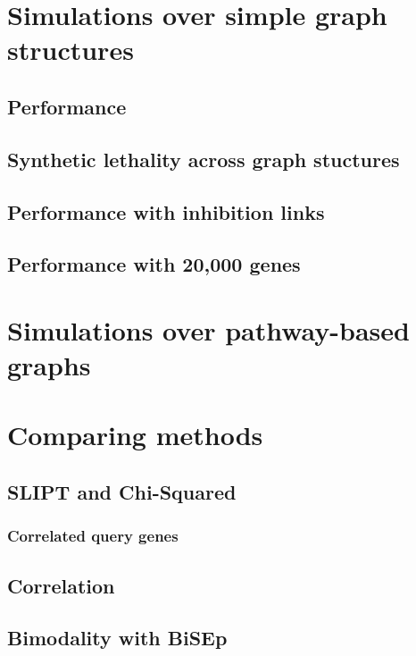 \section{Simulations over simple graph structures}
\subsection{Performance}
\subsection{Synthetic lethality across graph stuctures}
\subsection{Performance with inhibition links}
\subsection{Performance with 20,000 genes}

\section{Simulations over pathway-based graphs}

\section{Comparing methods}
\subsection{SLIPT and Chi-Squared}
\subsubsection{Correlated query genes}
\subsection{Correlation}
\subsection{Bimodality with BiSEp}

\iffalse
\section{Developing a linear model predictor of synthetic lethality}
\subsection{Linear models}
\subsection{Polynomial models}
\subsection{Conditioning}
\subsection{SLIPTv2}
\fi

